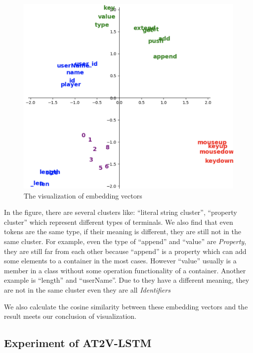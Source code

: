 \documentclass[T, E]{compsoft}
\begin{document}
\begin{figure}[!ht]
\centering
\includegraphics[scale=0.34]{pictures/node2vec_visualization.png}
\caption{The visualization of embedding vectors}
\label{fig:node2vec_visualization}
\end{figure}

In the figure, there are several clusters like: ``literal string cluster'', ``property cluster'' which represent different types of terminals. 
We also find that even tokens are the same type, if their meaning is different, they are still not in the same cluster. 
For example, even the type of ``append'' and ``value'' are \textit{Property}, they are still far from each other because ``append'' is a property which can add some elements to a container in the most cases.
However ``value'' usually is a member in a class without some operation functionality of a container. 
Another example is ``length'' and ``userName''.
Due to they have a different meaning, they are not in the same cluster even they are all \textit{Identifiers} 

We also calculate the cosine similarity between these embedding vectors and the result meets our conclusion of visualization. 



\subsection{Experiment of AT2V-LSTM}
\end{document}
